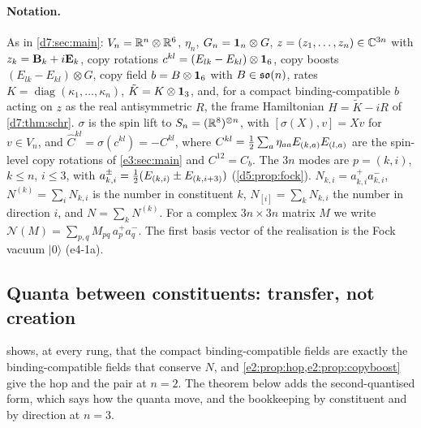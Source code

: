 \paragraph{Notation.} As in \cref{d7:sec:main}: $V_n=\mathbb{R}^n\otimes\mathbb{R}^6$, $\eta_n$, $G_n=\mathbf 1_n\otimes G$, $z=(z_1,\dots,z_n)\in\mathbb{C}^{3n}$ with
$z_k=\mathbf B_k+i\mathbf E_k$, copy rotations $c^{kl}=(E_{lk}-E_{kl})\otimes\mathbf 1_6$, copy boosts $(E_{lk}-E_{kl})\otimes G$, copy field $b=B\otimes\mathbf 1_6$ with
$B\in\mathfrak{so}(n)$, rates $K=\operatorname{diag}(\kappa_1,\dots,\kappa_n)$, $\tilde K=K\otimes\mathbf 1_3$, and, for a compact binding-compatible $b$ acting on $z$ as the
real antisymmetric $R$, the frame Hamiltonian $H=\tilde K-iR$ of \cref{d7:thm:schr}. $\sigma$ is the spin lift to
$S_n=(\mathbb{R}^8)^{\otimes n}$, with $[\sigma(X),v]=Xv$ for $v\in V_n$, and $\hat C^{kl}=\sigma(c^{kl})=-C^{kl}$, where $C^{kl}=\tfrac12\sum_a\eta_{aa}E_{(k,a)}E_{(l,a)}$ are the spin-level copy rotations of \cref{e3:sec:main} and $C^{12}=C_b$. The $3n$ modes are $p=(k,i)$, $k\le n$, $i\le3$, with
$a^\pm_{k,i}=\tfrac12(E_{(k,i)}\pm E_{(k,i+3)})$ (\cref{d5:prop:fock}). $N_{k,i}=a^+_{k,i}a^-_{k,i}$, $N^{(k)}=\sum_iN_{k,i}$ is the number in
constituent $k$, $N_{[i]}=\sum_kN_{k,i}$ the number in direction $i$, and $N=\sum_kN^{(k)}$. For a complex $3n\times3n$ matrix $M$ we write
$\mathcal N(M)=\sum_{p,q}M_{pq}\,a^+_pa^-_q$. The first basis vector of the realisation is the Fock vacuum $|0\rangle$ (e4-1a).

\subsection{Quanta between constituents: transfer, not creation}
\label{e4:sec:fock}

 shows, at every rung, that the compact binding-compatible fields are exactly the binding-compatible fields that
conserve $N$, and \cref{e2:prop:hop,e2:prop:copyboost} give the hop and the pair at $n=2$. The theorem below adds the second-quantised form,
which says how the quanta move, and the bookkeeping by constituent and by direction at $n=3$.


